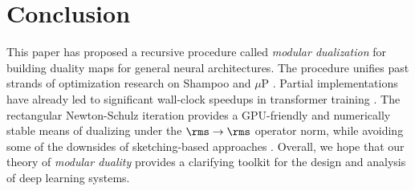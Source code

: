 \section{Conclusion}

This paper has proposed a recursive procedure called \textit{modular dualization} for building duality maps for general neural architectures. The procedure unifies past strands of optimization research on Shampoo \citep{Gupta2018ShampooPS} and $\mu$P \citep{Yang2021TensorPI}. Partial implementations have already led to significant wall-clock speedups in transformer training \citep{jordan2024cifar10}. The rectangular Newton-Schulz iteration provides a GPU-friendly and numerically stable means of dualizing under the $\rms\to\rms$ operator norm, while avoiding some of the downsides of sketching-based approaches \citep{spectral-descent-4}. Overall, we hope that our theory of \textit{modular duality} provides a clarifying toolkit for the design and analysis of deep learning systems.
